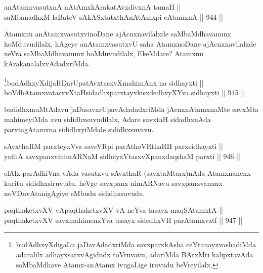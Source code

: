 \begin{shl}
anAtamxvasutxnA nA\s \s tAmx\s kArakatAvxdivxnA tamaH || \\
saMbanadhxM laBateV sAkASxtatxthA\s nAtAmx\s pi cA\s \s tamxnA \hfill || 944 ||  
\end{shl}

\begin{artha}
Atamxnu anAtamxvasutxvinoDane ajAcnxnavilalxde saMbaMdhavanunx hoMduvudilalx, hAgeye anAtamxvasutxvU saha AtamxnoDane ajAcnxnavilalxde neVra saMbaMdhavanunx hoMduvudilalx, EkeMdare? Atamxnu kArakanalalxvAdadxriMda.
\end{artha}



\begin{shl}
\footnote{budAdhxyXdigaLu jaDavAdadxriMda savxparxkAsha ceYtanayxvashadiMda adaralilx adhayxsatxvAgidudx toVruvavu, adariMda BArxMti kalipxtavAda saMbaMdhave Atamx-anAtamx ivugaLige iruvudu beVreyilalx.}budAdhxyXdijaRDarUpatAvxtasxvXmahimAnx na sidhayxti || \\
boVdhAtamxvatasxvXtaHsidadhxparxtayxkisxdedhxyXYva sidhayxti \hfill || 945 ||  
\end{shl}

\begin{artha}
budidhxmuMtAdavu jaDasavxrUpavAdadadxriMda jAcnxnAtamxnaMte savxMta mahimeyiMda avu sididhxsuvudilalx, Adare savxtaH sidadhxnAda parxtagAtamxna sididhxyiMdale sididhxsuvavu.
\end{artha}


\begin{shl}
sAvxthaRM parxteyxVva saveVR\s pi parAthoVR\s thaRH parxsidhayxti || \\
yathA savxpanxvinimARNaM sidheyxVtasxvXpanxdaqshaM parxti \hfill || 946 ||  
\end{shl}

\begin{artha}
elAlx parAdhiVna vAda vasutxvu sAvxthaR (savxtaMtarx)nAda Atamxnanenx kuritu sididhxsiruvudu. heVge savxpanx nimARNavu savxpanxvanunx noVDuvAtanigAgiye eMbudu sididhxsuvudu.
\end{artha}


\begin{shl}
paqthaketxvXV vA\s paqthaketxvXV vA neYva tasayx maqSAtamxtA || \\
paqthaketxvXV savxmahimenxYva tasayx sidedhxVH parAtamxvatf \hfill || 947 ||  
\end{shl}

